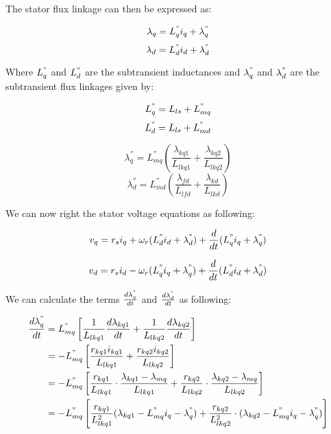 The stator flux linkage can then be expressed as:

\begin{equation}
\lambda_{q} = L_{q}^{"} i_q + \lambda_{q}^{"}
\end{equation}
\begin{equation}
\lambda_{d} = L_{d}^{"} i_d + \lambda_{d}^{"}
\end{equation}

Where $ L_{q}^{"}$ and $ L_{d}^{"}$ are the subtransient inductances and $ \lambda_{q}^{"}$ and $\lambda_{d}^{"}$ are the subtransient flux linkages given by:

\begin{equation}
L_q^" = L_{ls} + L_{mq}^"
\end{equation}
\begin{equation}
L_d^" = L_{ls} + L_{md}^"
\end{equation}

\begin{equation}
\lambda_q^{''} = L_{mq}^{''}\left( \frac{\lambda_{kq1}}{L_{lkq1}} + \frac{\lambda_{kq2}}{L_{lkq2}} \right)
\end{equation}
\begin{equation}
\lambda_d^{''} = L_{md}^{''}\left( \frac{\lambda_{fd}}{L_{lfd}} + \frac{\lambda_{kd}}{L_{lkd}} \right)
\end{equation}

We can now right the stator voltage equations as following:

\begin{equation}
v_q = r_s i_q + \omega_r (L_d^" i_d + \lambda_d^") + \frac{d}{dt} (L_q^" i_q + \lambda_q^")
\end{equation}

\begin{equation}
v_d = r_s i_d - \omega_r (L_q^" i_q + \lambda_q^") + \frac{d}{dt} (L_d^" i_d + \lambda_d^")
\end{equation}

We can calculate the terms $\frac{d \lambda_q^"}{dt}$ and  $\frac{d \lambda_d^"}{dt}$ as following:

\begin{align}
\begin{split}
\frac{d \lambda_q^"}{dt} &= L_{mq}^" \left[ \frac{1}{L_{lkq1}} \frac{d \lambda_{kq1}}{dt} + \frac{1}{L_{lkq2}} \frac{d \lambda_{kq2}}{dt} \right] \\
&=- L_{mq}^" \left[ \frac{r_{kq1} i_{kq1}}{L_{lkq1}} + \frac{r_{kq2} i_{kq2}}{L_{lkq2}} \right] \\
&=- L_{mq}^" \left[  \frac{r_{kq1}}{L_{lkq1}} \cdot \frac{\lambda_{kq1} - \lambda_{mq}}{L_{lkq1}} + \frac{r_{kq2}}{L_{lkq2}} \cdot \frac{\lambda_{kq2} - \lambda_{mq}}{L_{lkq2}} \right] \\
&=- L_{mq}^" \left[  \frac{r_{kq1}}{L_{lkq1}^2} ( \lambda_{kq1} - L_{mq}^" i_q - \lambda_q^") + \frac{r_{kq2}}{L_{lkq2}^2} \cdot (\lambda_{kq2}- L_{mq}^" i_q - \lambda_q^"  ) \right]
\end{split}
\end{align}

